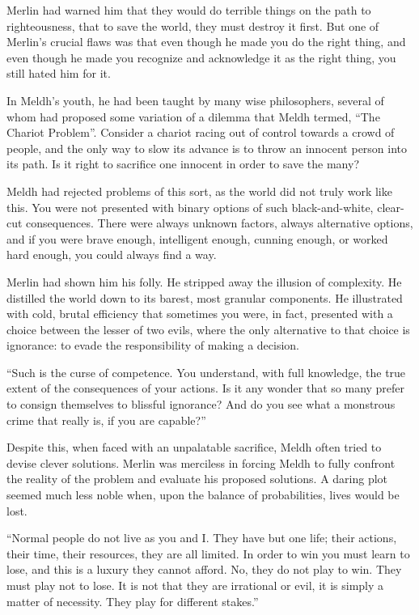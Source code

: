 Merlin had warned him that they would do terrible things on the path to righteousness, that to save the world, they must destroy it first. But one of Merlin’s crucial flaws was that even though he made you do the right thing, and even though he made you recognize and acknowledge it as the right thing, you still hated him for it.

In Meldh’s youth, he had been taught by many wise philosophers, several of whom had proposed some variation of a dilemma that Meldh termed, “The Chariot Problem”. Consider a chariot racing out of control towards a crowd of people, and the only way to slow its advance is to throw an innocent person into its path. Is it right to sacrifice one innocent in order to save the many?

Meldh had rejected problems of this sort, as the world did not truly work like this. You were not presented with binary options of such black-and-white, clear-cut consequences. There were always unknown factors, always alternative options, and if you were brave enough, intelligent enough, cunning enough, or worked hard enough, you could always find a way.

Merlin had shown him his folly. He stripped away the illusion of complexity. He distilled the world down to its barest, most granular components. He illustrated with cold, brutal efficiency that sometimes you were, in fact, presented with a choice between the lesser of two evils, where the only alternative to that choice is ignorance: to evade the responsibility of making a decision.

“Such is the curse of competence. You understand, with full knowledge, the true extent of the consequences of your actions. Is it any wonder that so many prefer to consign themselves to blissful ignorance? And do you see what a monstrous crime that really is, if you are capable?”

Despite this, when faced with an unpalatable sacrifice, Meldh often tried to devise clever solutions. Merlin was merciless in forcing Meldh to fully confront the reality of the problem and evaluate his proposed solutions. A daring plot seemed much less noble when, upon the balance of probabilities, lives would be lost.

“Normal people do not live as you and I. They have but one life; their actions, their time, their resources, they are all limited. In order to win you must learn to lose, and this is a luxury they cannot afford. No, they do not play to win. They must play not to lose. It is not that they are irrational or evil, it is simply a matter of necessity. They play for different stakes.”

